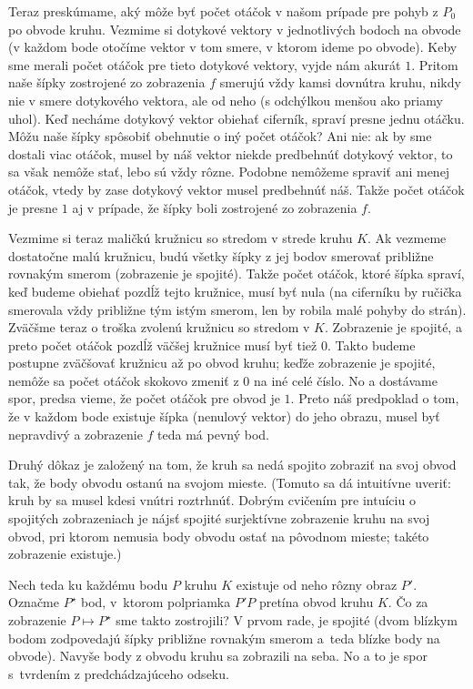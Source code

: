 \documentclass[a4paper]{article}
\begin{document}
Teraz preskúmame, aký môže byť počet otáčok v našom prípade pre pohyb z $P_0$ po obvode kruhu. Vezmime si dotykové vektory v jednotlivých bodoch na obvode (v každom bode otočíme vektor v tom smere, v ktorom ideme po obvode). Keby sme merali počet otáčok pre tieto dotykové vektory, vyjde nám akurát $1$. Pritom naše šípky zostrojené zo zobrazenia $f$ smerujú vždy kamsi dovnútra kruhu, nikdy nie v smere dotykového vektora, ale  od neho (s odchýlkou menšou ako priamy uhol). Keď necháme dotykový vektor obiehať ciferník, spraví presne jednu otáčku. Môžu naše šípky spôsobiť obehnutie o iný počet otáčok? Ani nie: ak by sme dostali viac otáčok, musel by náš vektor niekde predbehnúť dotykový vektor, to sa však nemôže stať, lebo sú vždy rôzne. Podobne nemôžeme spraviť ani menej otáčok, vtedy by zase dotykový vektor musel predbehnúť náš. Takže počet otáčok je presne $1$ aj v prípade, že šípky boli zostrojené zo zobrazenia $f$.

Vezmime si teraz maličkú kružnicu so stredom v strede kruhu $K$. Ak vezmeme dostatočne malú kružnicu, budú všetky šípky z jej bodov smerovať približne rovnakým smerom (zobrazenie je spojité). Takže počet otáčok, ktoré šípka spraví, keď budeme obiehať pozdĺž tejto kružnice, musí byť nula (na ciferníku by ručička smerovala vždy približne tým istým smerom, len by robila malé pohyby do strán). Zväčšme teraz o troška zvolenú kružnicu so stredom v $K$. Zobrazenie je spojité, a preto počet otáčok pozdĺž väčšej kružnice musí byť tiež $0$. Takto budeme postupne zväčšovať kružnicu až po obvod kruhu; keďže zobrazenie je spojité, nemôže sa počet otáčok skokovo zmeniť z $0$ na iné celé číslo. No a dostávame spor, predsa vieme, že počet otáčok pre obvod je $1$. Preto náš predpoklad o tom, že v každom bode existuje šípka (nenulový vektor) do jeho obrazu, musel byť nepravdivý a zobrazenie $f$ teda má pevný bod.

Druhý dôkaz je založený na tom, že kruh sa nedá spojito zobraziť na svoj obvod tak, že body obvodu ostanú na svojom mieste. (Tomuto sa dá intuitívne uveriť: kruh by sa musel kdesi vnútri roztrhnúť. Dobrým cvičením pre intuíciu o spojitých zobrazeniach je nájsť spojité surjektívne zobrazenie kruhu na svoj obvod, pri ktorom nemusia body obvodu ostať na pôvodnom mieste; takéto zobrazenie existuje.)

Nech teda ku každému bodu $P$ kruhu $K$ existuje od neho rôzny obraz $P'$. Označme $P^\star$ bod, v~ktorom polpriamka $P'P$ pretína obvod kruhu $K$. Čo za zobrazenie $P\mapsto P^\star$ sme takto zostrojili? V prvom rade, je spojité (dvom blízkym bodom zodpovedajú šípky približne rovnakým smerom a~teda blízke body na obvode). Navyše body z obvodu kruhu sa zobrazili na seba. No a to je spor s~tvrdením z predchádzajúceho odseku.
\end{document}
